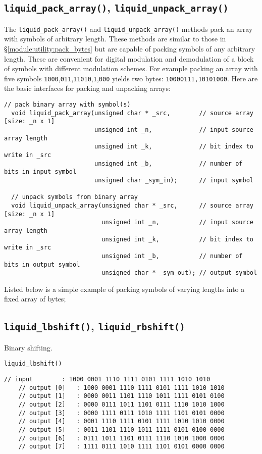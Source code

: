 \subsection{{\tt liquid\_pack\_array()},
            {\tt liquid\_unpack\_array()}}
\label{module:utility:pack_array}
%
The {\tt liquid\_pack\_array()} and {\tt liquid\_unpack\_array()}
methods pack an array with symbols of arbitrary length.
These methods are similar to those in
\S\ref{module:utility:pack_bytes}
but are capable of packing symbols of any arbitrary length.
These are convenient for digital modulation and demodulation of a block
of symbols with different modulation schemes.
For example packing an array with five symbols
{\tt 1000},{\tt 011},{\tt 11010},{\tt 1},{\tt 000} yields two bytes:
{\tt 10000111,10101000}.
%
Here are the basic interfaces for packing and unpacking arrays:
\begin{Verbatim}[fontsize=\small]
  // pack binary array with symbol(s)
  void liquid_pack_array(unsigned char * _src,        // source array [size: _n x 1]
                         unsigned int _n,             // input source array length
                         unsigned int _k,             // bit index to write in _src
                         unsigned int _b,             // number of bits in input symbol
                         unsigned char _sym_in);      // input symbol

  // unpack symbols from binary array
  void liquid_unpack_array(unsigned char * _src,      // source array [size: _n x 1]
                           unsigned int _n,           // input source array length
                           unsigned int _k,           // bit index to write in _src
                           unsigned int _b,           // number of bits in output symbol
                           unsigned char * _sym_out); // output symbol
\end{Verbatim}
%
Listed below is a simple example of packing symbols of varying lengths
into a fixed array of bytes;
%

%


\subsection{{\tt liquid\_lbshift()},
            {\tt liquid\_rbshift()}}
\label{module:utility:bshift}
Binary shifting.

{\tt liquid\_lbshift()}
\begin{Verbatim}[fontsize=\small]
    // input        : 1000 0001 1110 1111 0101 1111 1010 1010
    // output [0]   : 1000 0001 1110 1111 0101 1111 1010 1010
    // output [1]   : 0000 0011 1101 1110 1011 1111 0101 0100
    // output [2]   : 0000 0111 1011 1101 0111 1110 1010 1000
    // output [3]   : 0000 1111 0111 1010 1111 1101 0101 0000
    // output [4]   : 0001 1110 1111 0101 1111 1010 1010 0000
    // output [5]   : 0011 1101 1110 1011 1111 0101 0100 0000
    // output [6]   : 0111 1011 1101 0111 1110 1010 1000 0000
    // output [7]   : 1111 0111 1010 1111 1101 0101 0000 0000
\end{Verbatim}

